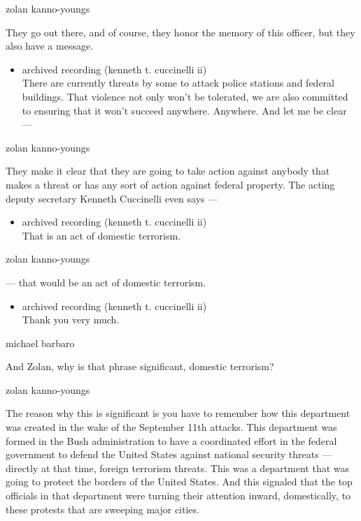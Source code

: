 zolan kanno-youngs

They go out there, and of course, they honor the memory of this officer,
but they also have a message.

\begin{itemize}
\tightlist
\item
  archived recording (kenneth t. cuccinelli ii)\\
  There are currently threats by some to attack police stations and
  federal buildings. That violence not only won't be tolerated, we are
  also committed to ensuring that it won't succeed anywhere. Anywhere.
  And let me be clear ---
\end{itemize}

zolan kanno-youngs

They make it clear that they are going to take action against anybody
that makes a threat or has any sort of action against federal property.
The acting deputy secretary Kenneth Cuccinelli even says ---

\begin{itemize}
\tightlist
\item
  archived recording (kenneth t. cuccinelli ii)\\
  That is an act of domestic terrorism.
\end{itemize}

zolan kanno-youngs

--- that would be an act of domestic terrorism.

\begin{itemize}
\tightlist
\item
  archived recording (kenneth t. cuccinelli ii)\\
  Thank you very much.
\end{itemize}

michael barbaro

And Zolan, why is that phrase significant, domestic terrorism?

zolan kanno-youngs

The reason why this is significant is you have to remember how this
department was created in the wake of the September 11th attacks. This
department was formed in the Bush administration to have a coordinated
effort in the federal government to defend the United States against
national security threats --- directly at that time, foreign terrorism
threats. This was a department that was going to protect the borders of
the United States. And this signaled that the top officials in that
department were turning their attention inward, domestically, to these
protests that are sweeping major cities.

